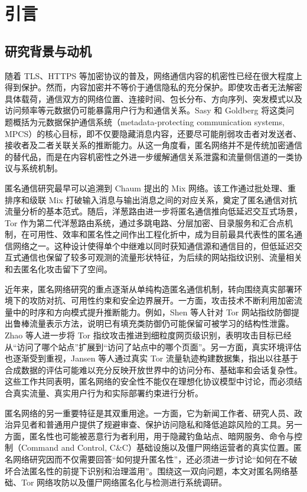 \section{引言}

\subsection{研究背景与动机}

随着 TLS、HTTPS 等加密协议的普及，网络通信内容的机密性已经在很大程度上得到保护。然而，内容加密并不等价于通信隐私的充分保护。即使攻击者无法解密具体载荷，通信双方的网络位置、连接时间、包长分布、方向序列、突发模式以及访问频率等元数据仍可能暴露用户行为和通信关系。Sasy 和 Goldberg 将这类问题概括为元数据保护通信系统（metadata-protecting communication systems, MPCS）的核心目标，即不仅要隐藏消息内容，还要尽可能削弱攻击者对发送者、接收者及二者关联关系的推断能力\cite{sasy2024sok}。从这一角度看，匿名网络并不是传统加密通信的替代品，而是在内容机密性之外进一步缓解通信关系泄露和流量侧信道的一类协议与系统机制。

匿名通信研究最早可以追溯到 Chaum 提出的 Mix 网络。该工作通过批处理、重排序和级联 Mix 打破输入消息与输出消息之间的对应关系，奠定了匿名通信对抗流量分析的基本范式\cite{chaum1981untraceable}。随后，洋葱路由进一步将匿名通信推向低延迟交互式场景，Tor 作为第二代洋葱路由系统，通过多跳电路、分层加密、目录服务和汇合点机制，在可用性、效率和匿名性之间作出工程化折中，成为目前最具代表性的匿名通信网络之一\cite{dingledine2004tor}。这种设计使得单个中继难以同时获知通信源和通信目的，但低延迟交互式通信也保留了较多可观测的流量形状特征，为后续的网站指纹识别、流量相关和去匿名化攻击留下了空间。

近年来，匿名网络研究的重点逐渐从单纯构造匿名通信机制，转向围绕真实部署环境下的攻防对抗、可用性约束和安全边界展开。一方面，攻击技术不断利用加密流量中的时序和方向模式提升推断能力。例如，Shen 等人针对 Tor 网站指纹防御提出鲁棒流量表示方法，说明已有填充类防御仍可能保留可被学习的结构性泄露\cite{shen2023subverting}。Zhao 等人进一步将 Tor 指纹攻击推进到细粒度网页级识别，表明攻击目标已经从“访问了哪个站点”扩展到“访问了站点中的哪个页面”\cite{zhao2024towards}。另一方面，真实环境评估也逐渐受到重视，Jansen 等人通过真实 Tor 流量轨迹构建数据集，指出以往基于合成数据的评估可能难以充分反映开放世界中的访问分布、基础率和会话复杂性\cite{jansen2026measurement}。这些工作共同表明，匿名网络的安全性不能仅在理想化协议模型中讨论，而必须结合真实流量、真实用户行为和实际部署约束进行分析。

匿名网络的另一重要特征是其双重用途。一方面，它为新闻工作者、研究人员、政治异见者和普通用户提供了规避审查、保护访问隐私和降低追踪风险的工具。另一方面，匿名性也可能被恶意行为者利用，用于隐藏钓鱼站点、暗网服务、命令与控制（Command and Control, C\&C）基础设施以及僵尸网络运营者的真实位置。匿名网络研究因而不仅需要回答“如何提升匿名性”，还必须进一步讨论“如何在不破坏合法匿名性的前提下识别和治理滥用”。围绕这一双向问题，本文对匿名网络基础、Tor 网络攻防以及僵尸网络匿名化与检测进行系统调研。


